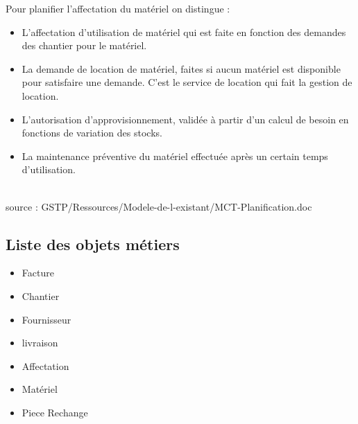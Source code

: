 	Pour planifier l'affectation du matériel on distingue :\\
	\begin{itemize}
		\item L'affectation d'utilisation de matériel qui est faite en fonction des demandes des chantier pour le matériel.\\
		\item La demande de location de matériel, faites si aucun matériel est disponible pour satisfaire une demande. C'est le service de location qui fait la gestion de location.\\
		\item L'autorisation d'approvisionnement, validée à partir d'un calcul de besoin en fonctions de variation des stocks.\\
		\item La maintenance préventive du matériel effectuée après un certain temps d'utilisation.\\
	\end{itemize}
\hfill\\

source : GSTP/Ressources/Modele-de-l-existant/MCT-Planification.doc


\subsection{Liste des objets métiers}
\begin{itemize}
	\item Facture\\
	\item Chantier\\
	\item Fournisseur\\
	\item livraison\\
	\item Affectation\\
	\item Matériel\\
	\item Piece Rechange\\
\end{itemize}


